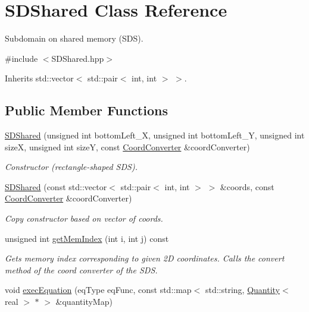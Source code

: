 \hypertarget{classSDShared}{
\section{SDShared Class Reference}
\label{classSDShared}
}


Subdomain on shared memory (SDS).  


{\ttfamily \#include $<$SDShared.hpp$>$}

Inherits std::vector$<$ std::pair$<$ int, int $>$ $>$.\subsection*{Public Member Functions}
\begin{DoxyCompactItemize}
\item 
\hyperlink{classSDShared_a51004922c9fbb3f46dd5533dd95a3c12}{SDShared} (unsigned int bottomLeft\_\-X, unsigned int bottomLeft\_\-Y, unsigned int sizeX, unsigned int sizeY, const \hyperlink{classCoordConverter}{CoordConverter} \&coordConverter)
\begin{DoxyCompactList}\small\item\em Constructor (rectangle-\/shaped SDS). \item\end{DoxyCompactList}\item 
\hypertarget{classSDShared_a144fb5b0439010b5ba9db386a5b1c636}{
\hyperlink{classSDShared_a144fb5b0439010b5ba9db386a5b1c636}{SDShared} (const std::vector$<$ std::pair$<$ int, int $>$ $>$ \&coords, const \hyperlink{classCoordConverter}{CoordConverter} \&coordConverter)}
\label{classSDShared_a144fb5b0439010b5ba9db386a5b1c636}

\begin{DoxyCompactList}\small\item\em Copy constructor based on vector of coords. \item\end{DoxyCompactList}\item 
unsigned int \hyperlink{classSDShared_a0ee0c276ea09e1bd0aea8e4930ebe253}{getMemIndex} (int i, int j) const 
\begin{DoxyCompactList}\small\item\em Gets memory index corresponding to given 2D coordinates. Calls the convert method of the coord converter of the SDS. \item\end{DoxyCompactList}\item 
void \hyperlink{classSDShared_afc27ac7db0bcb8177f54bb5a682606c1}{execEquation} (eqType eqFunc, const std::map$<$ std::string, \hyperlink{classQuantity}{Quantity}$<$ real $>$ $\ast$ $>$ \&quantityMap)
\end{DoxyCompactItemize}


